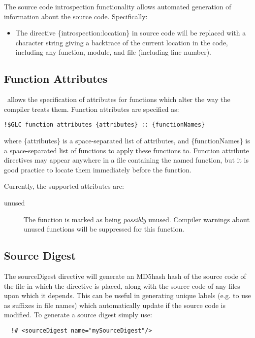 The source code introspection functionality allows automated generation of information about the source code. Specifically:
\begin{itemize}
\item The directive {\normalfont \ttfamily \{introspection:location\}} in source code will be replaced with a character string giving a backtrace of the current location in the code, including any function, module, and file (including line number).
\end{itemize}

\subsection{Function Attributes}

\glc\ allows the specification of attributes for functions which alter the way the compiler treats them. Function attributes are specified as:
\begin{verbatim}
!$GLC function attributes {attributes} :: {functionNames}
\end{verbatim}
where {\normalfont \ttfamily \{attributes\}} is a space-separated list of attributes, and {\normalfont \ttfamily \{functionNames\}} is a space-separated list of functions to apply these functions to. Function attribute directives may appear anywhere in a file containing the named function, but it is good practice to locate them immediately before the function.

Currently, the supported attributes are:
\begin{description}
\item[{\normalfont \ttfamily unused}] The function is marked as being \emph{possibly} unused. Compiler warnings about unused functions will be suppressed for this function.
\end{description}

\subsection{Source Digest}

The {\normalfont \ttfamily sourceDigest} directive will generate an \gls{MD5hash} hash of the source code of the file in which the directive is placed, along with the source code of any files upon which it depends. This can be useful in generating unique labels (e.g. to use as suffixes in file names) which automatically update if the source code is modified. To generate a source digest simply use:

\begin{lstlisting}
  !# <sourceDigest name="mySourceDigest"/>
\end{lstlisting}

